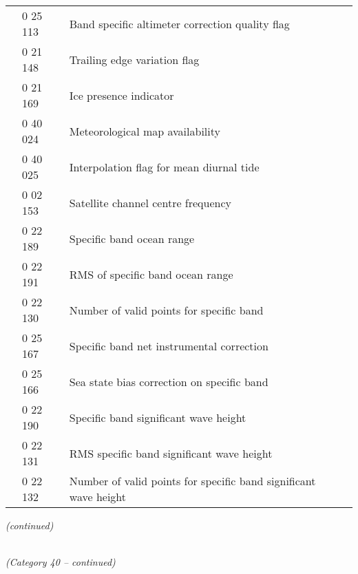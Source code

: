 \begin{longtable}[]{@{}llll@{}}
& 0 25 113 & Band specific altimeter correction quality flag &\tabularnewline
& 0 21 148 & Trailing edge variation flag &\tabularnewline
& 0 21 169 & Ice presence indicator &\tabularnewline
& 0 40 024 & Meteorological map availability &\tabularnewline
& 0 40 025 & Interpolation flag for mean diurnal tide &\tabularnewline
& 0 02 153 & Satellite channel centre frequency &\tabularnewline
& 0 22 189 & Specific band ocean range &\tabularnewline
& 0 22 191 & RMS of specific band ocean range &\tabularnewline
& 0 22 130 & Number of valid points for specific band &\tabularnewline
& 0 25 167 & Specific band net instrumental correction &\tabularnewline
& 0 25 166 & Sea state bias correction on specific band &\tabularnewline
& 0 22 190 & Specific band significant wave height &\tabularnewline
& 0 22 131 & RMS specific band significant wave height &\tabularnewline
& 0 22 132 & Number of valid points for specific band significant wave height &\tabularnewline
\bottomrule
\end{longtable}

\emph{(continued)}

\emph{\\
(Category 40 -- continued)}

